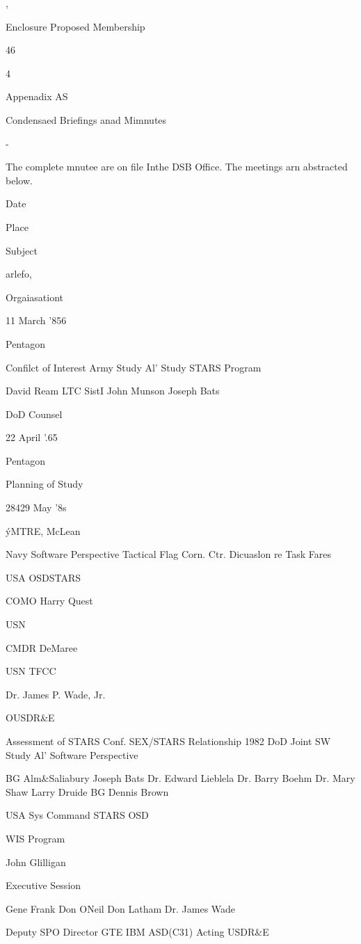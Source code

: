 \documentclass[12pt]{article}
\begin{document}
,

Enclosure
Proposed Membership

46

4


Appenadix AS
~

Condensaed Briefings anad Mimnutes

-

The complete mnutee are on file Inthe DSB Office. The meetings arn abstracted below.

Date

Place

Subject

arlefo,

Orgaiasationt

11 March '856

Pentagon

Confilct of Interest
Army Study
Al' Study
STARS Program

David Ream
LTC SistI
John Munson
Joseph Bats

DoD Counsel

22 April '.65

Pentagon

Planning of Study

28429 May '8s

ýMTRE, McLean

Navy Software Perspective
Tactical Flag Corn. Ctr.
Dicuaslon re Task Fares

USA
OSDSTARS

COMO Harry Quest

USN

CMDR DeMaree

USN TFCC

Dr. James P. Wade, Jr.

OUSDR\&E

Assessment of STARS Conf.
SEX/STARS Relationship
1982 DoD Joint SW Study
Al' Software Perspective

BG Alm\&Saliabury
Joseph Bats
Dr. Edward Lieblela
Dr. Barry Boehm
Dr. Mary Shaw
Larry Druide
BG Dennis Brown

USA Sys Command
STARS
OSD

WIS Program

John Glilligan

Executive Session

Gene Frank
Don ONeil
Don Latham
Dr. James Wade

Deputy SPO Director
GTE
IBM
ASD(C31)
Acting USDR\&E
\end{document}
